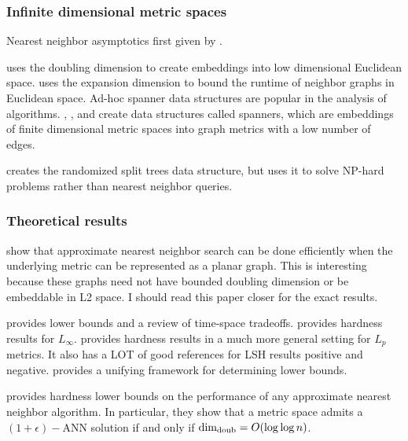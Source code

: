 \documentclass[../main.tex]{subfiles}
\newcommand{\doubdim}{\text{dim}_\textnormal{doub}}
\begin{document}
\subsubsection{Infinite dimensional metric spaces}

Nearest neighbor asymptotics first given by \citet{cover1967nearest}.

\cite{indyk2007nearest} uses the doubling dimension to create embeddings into low dimensional Euclidean space.
\cite{connor2010fast} uses the expansion dimension to bound the runtime of neighbor graphs in Euclidean space.
Ad-hoc spanner data structures are popular in the analysis of algorithms.
\cite{chan2005hierarchical}, \cite{gottlieb2008optimal}, \cite{gottlieb2014light} and \cite{gottlieb2015light} create data structures called spanners,
which are embeddings of finite dimensional metric spaces into graph metrics with a low number of edges.

\cite{talwar2004bypassing} creates the randomized split trees data structure,
but uses it to solve NP-hard problems rather than nearest neighbor queries.


\subsubsection{Theoretical results}

\cite{abraham2015approximate} show that approximate nearest neighbor search can be done efficiently when the underlying metric can be represented as a planar graph.
This is interesting because these graphs need not have bounded doubling dimension or be embeddable in L2 space.
I should read this paper closer for the exact results.

\cite{borodin1999lower,barkol2000tighter,panigrahy2008geometric} provides lower bounds and a review of time-space tradeoffs.
\cite{andoni2008hardness} provides hardness results for $L_\infty$.
\cite{andoni2016lower} provides hardness results in a much more general setting for $L_p$ metrics.
It also has a LOT of good references for LSH results positive and negative.
\cite{p2011unifying} provides a unifying framework for determining lower bounds.

\cite{krauthgamer2005black} provides hardness lower bounds on the performance of any approximate nearest neighbor algorithm. 
In particular, they show that a metric space admits a $(1+\epsilon)-$ANN solution if and only if $\doubdim = O(\log \log n)$.
\end{document}
